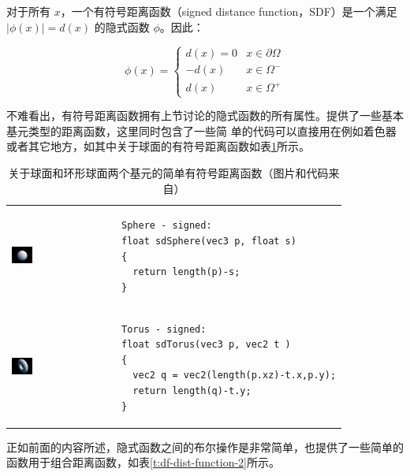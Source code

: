 对于所有 ${x}$，一个有符号距离函数（signed distance function，SDF）是一个满足 $|\phi({x})| = d({x})$ 的隐式函数 $\phi$。因此：

\begin{equation}
	\phi({x})=\begin{cases}
		d({x})=0 & {x}\in\partial\Omega \\
		-d({x}) & {x}\in \Omega^{-} \\
		d({x}) & {x}\in \Omega^{+}
	\end{cases}
\end{equation}

不难看出，有符号距离函数拥有上节讨论的隐式函数的所有属性。\cite{w:distance-function}提供了一些基本基元类型的距离函数，这里同时包含了一些简 单的代码可以直接用在例如着色器或者其它地方，如其中关于球面的有符号距离函数如表\ref{t:df-dist-function-1}所示。

\begin{table}
\begin{tabular}{m{3.0cm}m{}} 
\includegraphics[width=0.21\textwidth]{figures/df/sphere} &
	 \begin{lstlisting}
Sphere - signed:
float sdSphere(vec3 p, float s)
{
  return length(p)-s;
}
\end{lstlisting} \\
   \includegraphics[width=0.21\textwidth]{graphics/df/torus} & 
    \begin{lstlisting}
Torus - signed:
float sdTorus(vec3 p, vec2 t )
{
  vec2 q = vec2(length(p.xz)-t.x,p.y);
  return length(q)-t.y;
}
   \end{lstlisting}
\end{tabular}
\caption{关于球面和环形球面两个基元的简单有符号距离函数（图片和代码来自\cite{w:distance-function}）}
\label{t:df-dist-function-1}
\end{table}

正如前面的内容所述，隐式函数之间的布尔操作是非常简单，\cite{w:distance-function}也提供了一些简单的函数用于组合距离函数，如表\ref{t:df-dist-function-2}所示。

